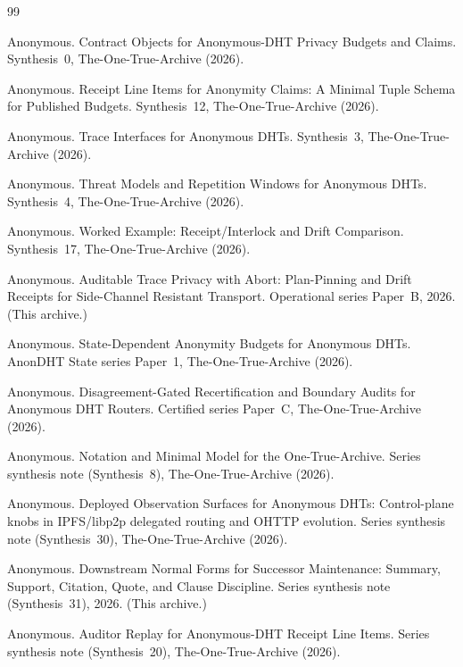 \documentclass[11pt]{article}
\begin{document}
\begin{thebibliography}{99}\small

Anonymous.
\newblock Contract Objects for Anonymous-DHT Privacy Budgets and Claims.
\newblock Synthesis~0, The-One-True-Archive (2026).

Anonymous.
\newblock Receipt Line Items for Anonymity Claims: A Minimal Tuple Schema for Published Budgets.
\newblock Synthesis~12, The-One-True-Archive (2026).

Anonymous.
\newblock Trace Interfaces for Anonymous DHTs.
\newblock Synthesis~3, The-One-True-Archive (2026).

Anonymous.
\newblock Threat Models and Repetition Windows for Anonymous DHTs.
\newblock Synthesis~4, The-One-True-Archive (2026).

Anonymous.
\newblock Worked Example: Receipt/Interlock and Drift Comparison.
\newblock Synthesis~17, The-One-True-Archive (2026).

Anonymous.
\newblock Auditable Trace Privacy with Abort: Plan-Pinning and Drift Receipts for Side-Channel Resistant Transport.
\newblock Operational series Paper~B, 2026. (This archive.)

Anonymous.
\newblock State-Dependent Anonymity Budgets for Anonymous DHTs.
\newblock AnonDHT State series Paper~1, The-One-True-Archive (2026).

Anonymous.
\newblock Disagreement-Gated Recertification and Boundary Audits for Anonymous DHT Routers.
\newblock Certified series Paper~C, The-One-True-Archive (2026).

Anonymous.
\newblock Notation and Minimal Model for the One-True-Archive.
\newblock Series synthesis note (Synthesis~8), The-One-True-Archive (2026).

Anonymous.
\newblock Deployed Observation Surfaces for Anonymous DHTs: Control-plane knobs in IPFS/libp2p delegated routing and OHTTP evolution.
\newblock Series synthesis note (Synthesis~30), The-One-True-Archive (2026).

Anonymous.
\newblock Downstream Normal Forms for Successor Maintenance: Summary, Support, Citation, Quote, and Clause Discipline.
\newblock Series synthesis note (Synthesis~31), 2026. (This archive.)

Anonymous.
\newblock Auditor Replay for Anonymous-DHT Receipt Line Items.
\newblock Series synthesis note (Synthesis~20), The-One-True-Archive (2026).

\end{thebibliography}
\end{document}
